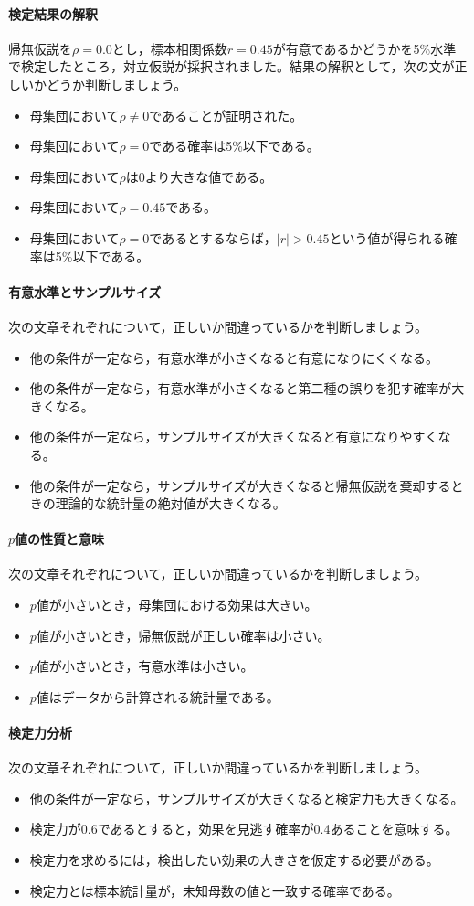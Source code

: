 \documentclass{ltjsbook}
\begin{document}
\paragraph{検定結果の解釈}帰無仮説を$\rho=0.0$とし，標本相関係数$r=0.45$が有意であるかどうかを5\%水準で検定したところ，対立仮説が採択されました。結果の解釈として，次の文が正しいかどうか判断しましょう。
\begin{itemize}
	\item 母集団において$\rho\neq 0$であることが証明された。
	\item 母集団において$\rho=0$である確率は5\%以下である。
	\item 母集団において$\rho$は0より大きな値である。
	\item 母集団において$\rho=0.45$である。
	\item 母集団において$\rho=0$であるとするならば，$|r|>0.45$という値が得られる確率は5\%以下である。
\end{itemize}

\paragraph{有意水準とサンプルサイズ}次の文章それぞれについて，正しいか間違っているかを判断しましょう。
\begin{itemize}
	\item 他の条件が一定なら，有意水準が小さくなると有意になりにくくなる。
	\item 他の条件が一定なら，有意水準が小さくなると第二種の誤りを犯す確率が大きくなる。
	\item 他の条件が一定なら，サンプルサイズが大きくなると有意になりやすくなる。
	\item 他の条件が一定なら，サンプルサイズが大きくなると帰無仮説を棄却するときの理論的な統計量の絶対値が大きくなる。
\end{itemize}
\paragraph{$p$値の性質と意味}次の文章それぞれについて，正しいか間違っているかを判断しましょう。
\begin{itemize}
	\item $p$値が小さいとき，母集団における効果は大きい。
	\item $p$値が小さいとき，帰無仮説が正しい確率は小さい。
	\item $p$値が小さいとき，有意水準は小さい。
	\item $p$値はデータから計算される統計量である。
\end{itemize}
\paragraph{検定力分析}次の文章それぞれについて，正しいか間違っているかを判断しましょう。
\begin{itemize}
	\item 他の条件が一定なら，サンプルサイズが大きくなると検定力も大きくなる。
	\item 検定力が0.6であるとすると，効果を見逃す確率が0.4あることを意味する。
	\item 検定力を求めるには，検出したい効果の大きさを仮定する必要がある。
	\item 検定力とは標本統計量が，未知母数の値と一致する確率である。
\end{itemize}
\end{document}
